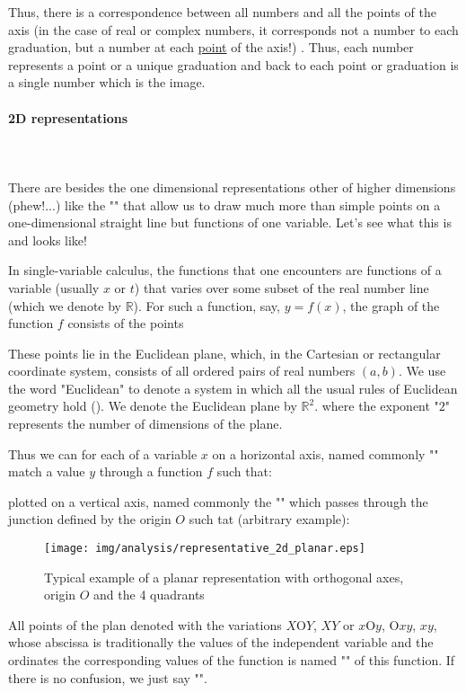 Thus, there is a correspondence between all numbers and all the points of the axis (in the case of real or complex numbers, it corresponds not a number to each graduation, but a number at each \underline{point} of the axis!) . Thus, each number represents a point or a unique graduation and back to each point or graduation is a single number which is the image.

\pagebreak
\paragraph{2D representations}\mbox{}\\\\
There are besides the one dimensional representations other of higher dimensions (phew!...) like the "" that allow us to draw much more than simple points on a one-dimensional straight line but functions of one variable. Let's see what this is and looks like!

In single-variable calculus, the functions that one encounters are functions of a variable (usually $x$ or $t$) that varies over some subset of the real number line (which we denote by $\mathbb{R}$). For such a function, say, $y = f (x)$, the graph of the function $f$ consists of the points 
	
These points lie in the Euclidean plane, which, in the Cartesian or rectangular
coordinate system, consists of all ordered pairs of real numbers $(a,b)$. We use the word "Euclidean" to denote a system in which all the usual rules of Euclidean geometry hold (). We denote the Euclidean plane by $\mathbb{R}^2$. where the exponent "$2$" represents the number of dimensions of the plane.

Thus we can for each of a variable $x$ on a horizontal axis, named commonly "" match a value $y$ through a function $f$ such that:
	
plotted on a vertical axis, named commonly the "" which passes through the junction defined by the origin $O$ such tat (arbitrary example):
\begin{figure}[H]
\centering
\texttt{[image: img/analysis/representative\_2d\_planar.eps]}
\caption{Typical example of a planar representation with orthogonal axes, origin $O$ and the 4 quadrants}
\end{figure}
All points of the plan denoted with the variations $X\text{O}Y$, $XY$ or $x\text{O}y$, $\text{O}xy$, $xy$, whose abscissa is traditionally the values of the independent variable and the ordinates the corresponding values of the function is named "" of this function. If there is no confusion, we just say "".

